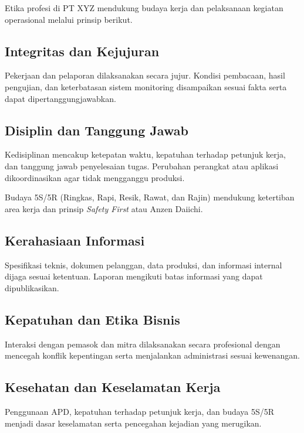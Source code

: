 Etika profesi di PT XYZ mendukung budaya kerja dan pelaksanaan kegiatan operasional melalui prinsip berikut.

\subsection{Integritas dan Kejujuran}

Pekerjaan dan pelaporan dilaksanakan secara jujur. Kondisi pembacaan, hasil pengujian, dan keterbatasan sistem monitoring disampaikan sesuai fakta serta dapat dipertanggungjawabkan.

\subsection{Disiplin dan Tanggung Jawab}

Kedisiplinan mencakup ketepatan waktu, kepatuhan terhadap petunjuk kerja, dan tanggung jawab penyelesaian tugas. Perubahan perangkat atau aplikasi dikoordinasikan agar tidak mengganggu produksi.

Budaya 5S/5R (Ringkas, Rapi, Resik, Rawat, dan Rajin) mendukung ketertiban area kerja dan prinsip \textit{Safety First} atau Anzen Daiichi.

\subsection{Kerahasiaan Informasi}

Spesifikasi teknis, dokumen pelanggan, data produksi, dan informasi internal dijaga sesuai ketentuan. Laporan mengikuti batas informasi yang dapat dipublikasikan.

\subsection{Kepatuhan dan Etika Bisnis}

Interaksi dengan pemasok dan mitra dilaksanakan secara profesional dengan mencegah konflik kepentingan serta menjalankan administrasi sesuai kewenangan.

\subsection{Kesehatan dan Keselamatan Kerja}

Penggunaan APD, kepatuhan terhadap petunjuk kerja, dan budaya 5S/5R menjadi dasar keselamatan serta pencegahan kejadian yang merugikan.

